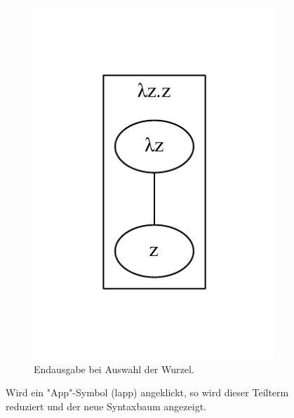 \documentclass[parskip=full,11pt,twoside]{scrartcl}
\begin{document}
{\begin{figure}[H]
\begin{subfigure}{0.25\textwidth}
		\includegraphics[width=\textwidth]{img/displayTree5}
		\caption{Endausgabe bei Auswahl der Wurzel.}	
	\end{subfigure}
	\caption{Wird ein "App"-Symbol (\gls{lapp}) angeklickt, so wird dieser Teilterm reduziert und der neue Syntaxbaum angezeigt.}
\end{figure}


}
\end{document}
